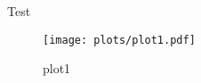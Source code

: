 \documentclass{scrartcl}
\begin{document}
Test
\begin{figure}
  \centering
  \texttt{[image: plots/plot1.pdf]}
  \caption{plot1}
\end{figure}
\end{document}

